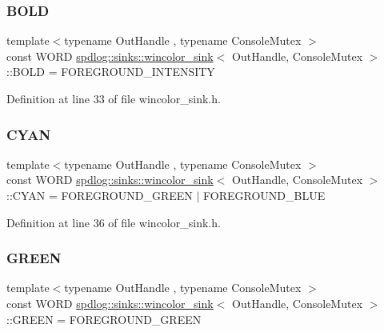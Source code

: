 \subsubsection{\texorpdfstring{B\+O\+LD}{BOLD}}
{\footnotesize\ttfamily template$<$typename Out\+Handle , typename Console\+Mutex $>$ \\
const W\+O\+RD \hyperlink{classspdlog_1_1sinks_1_1wincolor__sink}{spdlog\+::sinks\+::wincolor\+\_\+sink}$<$ Out\+Handle, Console\+Mutex $>$\+::B\+O\+LD = F\+O\+R\+E\+G\+R\+O\+U\+N\+D\+\_\+\+I\+N\+T\+E\+N\+S\+I\+TY}



Definition at line 33 of file wincolor\+\_\+sink.\+h.

\mbox{\label{classspdlog_1_1sinks_1_1wincolor__sink_a6cbc30363fd20b20c1cd0f22211f0612}} 
\subsubsection{\texorpdfstring{C\+Y\+AN}{CYAN}}
{\footnotesize\ttfamily template$<$typename Out\+Handle , typename Console\+Mutex $>$ \\
const W\+O\+RD \hyperlink{classspdlog_1_1sinks_1_1wincolor__sink}{spdlog\+::sinks\+::wincolor\+\_\+sink}$<$ Out\+Handle, Console\+Mutex $>$\+::C\+Y\+AN = F\+O\+R\+E\+G\+R\+O\+U\+N\+D\+\_\+\+G\+R\+E\+EN $\vert$ F\+O\+R\+E\+G\+R\+O\+U\+N\+D\+\_\+\+B\+L\+UE}



Definition at line 36 of file wincolor\+\_\+sink.\+h.

\mbox{\label{classspdlog_1_1sinks_1_1wincolor__sink_a39daa889c7395936e2caf95baf2c4181}} 
\subsubsection{\texorpdfstring{G\+R\+E\+EN}{GREEN}}
{\footnotesize\ttfamily template$<$typename Out\+Handle , typename Console\+Mutex $>$ \\
const W\+O\+RD \hyperlink{classspdlog_1_1sinks_1_1wincolor__sink}{spdlog\+::sinks\+::wincolor\+\_\+sink}$<$ Out\+Handle, Console\+Mutex $>$\+::G\+R\+E\+EN = F\+O\+R\+E\+G\+R\+O\+U\+N\+D\+\_\+\+G\+R\+E\+EN}



